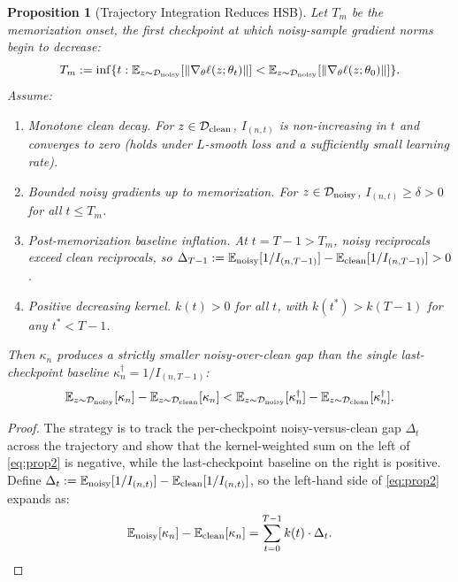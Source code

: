\documentclass[12pt, a4paper, twoside]{book}
\numberwithin{equation}{chapter}
\theoremstyle{plain}
\newtheorem{proposition}[theorem]{Proposition}
\theoremstyle{definition}
\theoremstyle{remark}
\newenvironment{foldable}{}{}
\begin{document}
\begin{foldable}
  \begin{proposition}[Trajectory Integration Reduces HSB] \label{prop:traj}
    Let $T_m$ be the memorization onset, the first checkpoint at which noisy-sample gradient norms begin to decrease:
    \begin{equation*}
      T_m := \inf\{t : \mathbb{E}_{z \sim \mathcal{D}_\textup{noisy}}[\|\nabla_\theta \ell(z;\theta_t)\|] < \mathbb{E}_{z \sim \mathcal{D}_\textup{noisy}}[\|\nabla_\theta \ell(z;\theta_0)\|]\}.
    \end{equation*}
    Assume:
    \begin{enumerate}[label=\textbf{(A\arabic*)},leftmargin=*]
      \item \textit{Monotone clean decay.} For $z \in \mathcal{D}_\textup{clean}$, $I_{(n,t)}$ is non-increasing in $t$ and converges to zero (holds under $L$-smooth loss and a sufficiently small learning rate).
      \item \textit{Bounded noisy gradients up to memorization.} For $z \in \mathcal{D}_\textup{noisy}$, $I_{(n,t)} \geq \delta > 0$ for all $t \leq T_m$.
      \item \textit{Post-memorization baseline inflation.} At $t = T-1 > T_m$, noisy reciprocals exceed clean reciprocals, so $\Delta_{T-1} := \mathbb{E}_\textup{noisy}[1/I_{(n,T-1)}] - \mathbb{E}_\textup{clean}[1/I_{(n,T-1)}] > 0$.
      \item \textit{Positive decreasing kernel.} $k(t) > 0$ for all $t$, with $k(t^*) > k(T-1)$ for any $t^* < T-1$.
    \end{enumerate}
    Then $\kappa_n$ produces a strictly smaller noisy-over-clean gap than the single last-checkpoint baseline $\kappa^\dagger_n = 1/I_{(n,T-1)}$:
    \begin{equation}
      \mathbb{E}_{z \sim \mathcal{D}_\textup{noisy}}[\kappa_n] - \mathbb{E}_{z \sim \mathcal{D}_\textup{clean}}[\kappa_n]
      < \mathbb{E}_{z \sim \mathcal{D}_\textup{noisy}}[\kappa^\dagger_n] - \mathbb{E}_{z \sim \mathcal{D}_\textup{clean}}[\kappa^\dagger_n].
      \label{eq:prop2}
    \end{equation}
  \end{proposition}
  \begin{proof}
    The strategy is to track the per-checkpoint noisy-versus-clean gap $\Delta_t$ across the trajectory and show that the kernel-weighted sum on the left of \eqref{eq:prop2} is negative, while the last-checkpoint baseline on the right is positive.
    Define $\Delta_t := \mathbb{E}_\textup{noisy}[1/I_{(n,t)}] - \mathbb{E}_\textup{clean}[1/I_{(n,t)}]$, so the left-hand side of \eqref{eq:prop2} expands as:
    \begin{equation*}
      \mathbb{E}_\textup{noisy}[\kappa_n] - \mathbb{E}_\textup{clean}[\kappa_n] = \sum_{t=0}^{T-1} k(t) \cdot \Delta_t.
    \end{equation*}


\end{proof}
\end{foldable}
\end{document}
